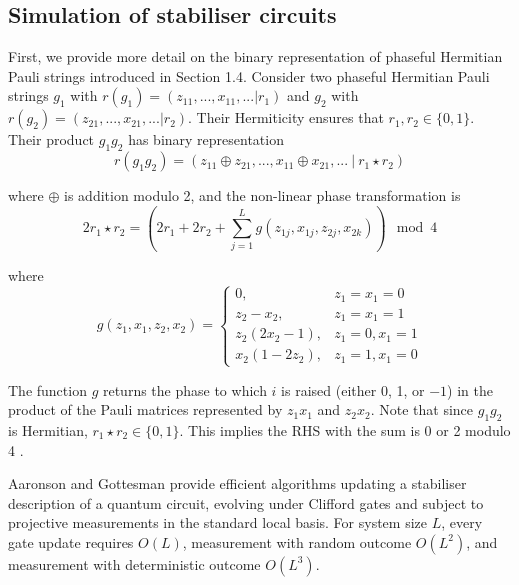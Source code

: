 \documentclass[10pt]{article}
\begin{document}
\newpage
\begin{appendices}


\section{Simulation of stabiliser circuits}

First, we provide more detail on the binary representation of phaseful Hermitian Pauli strings introduced in Section 1.4. Consider two phaseful Hermitian Pauli strings $g_1$ with $r(g_1)=(z_{11},...,x_{11},... | r_1)$ and $g_2$ with $r(g_2)=(z_{21},...,x_{21}, ... | r_2)$. Their Hermiticity ensures that $r_1,r_2 \in \{0,1\}$. Their product $g_1 g_2$ has binary representation
\begin{equation}
r(g_1 g_2) = (z_{11} \oplus z_{21}, ..., x_{11} \oplus x_{21}, ... \ | \ r_1 \star r_2 )
\end{equation}

where $\oplus$ is addition modulo 2, and the non-linear phase transformation is
\begin{equation}
2 r_1 \star r_2 = \left(2r_1 + 2r_2 + \sum_{j=1}^L g(z_{1j}, x_{1j}, z_{2j}, x_{2k})\right) \mod 4
\end{equation}

where
\begin{equation}
g(z_1, x_1, z_2, x_2) = 
\begin{cases}
0, 			 & z_1 = x_1 = 0 \\
z_2-x_2,	 & z_1 = x_1 = 1 \\
z_2(2x_2-1), & z_1 = 0, x_1 = 1 \\
x_2(1-2z_2), & z_1 = 1, x_1 = 0 
\end{cases}
\end{equation}

The function $g$ returns the phase to which $i$ is raised (either 0, 1, or $-1$) in the product of the Pauli matrices represented by $z_1 x_1$ and $z_2 x_2$. Note that since $g_1g_2$ is Hermitian, $r_1 \star r_2 \in \{0,1\}$. This implies the RHS with the sum is 0 or 2 modulo 4 \cite{aaronson2004improved}.

Aaronson and Gottesman \cite{aaronson2004improved} provide efficient algorithms updating a stabiliser description of a quantum circuit, evolving under Clifford gates and subject to projective measurements in the standard local basis. For system size $L$, every gate update requires $O(L)$, measurement with random outcome $O(L^2)$, and measurement with deterministic outcome $O(L^3)$.


\end{appendices}
\end{document}
